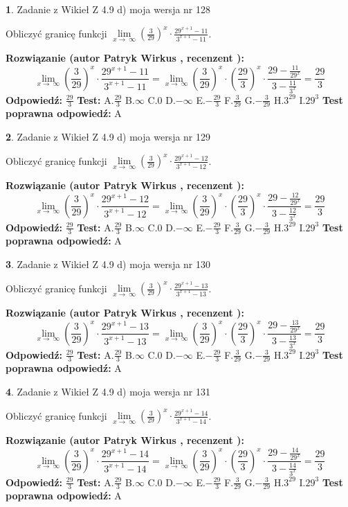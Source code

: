 \documentclass[12pt, a4paper]{article}
\theoremstyle{definition} %
\newtheorem{zad}{}
\newcommand{\zadStart}[1]{\begin{zad}#1\newline}
\newcommand{\zadStop}{\end{zad}}
\newcommand{\rozwStart}[2]{\noindent \textbf{Rozwiązanie (autor #1 , recenzent #2): }\newline}
\newcommand{\rozwStop}{\newline}
\newcommand{\odpStart}{\noindent \textbf{Odpowiedź:}\newline}
\newcommand{\odpStop}{\newline}
\newcommand{\testStart}{\noindent \textbf{Test:}\newline}
\newcommand{\testStop}{\newline}
\newcommand{\kluczStart}{\noindent \textbf{Test poprawna odpowiedź:}\newline}
\newcommand{\kluczStop}{\newline}
\begin{document}
\zadStart{Zadanie z Wikieł Z 4.9 d) moja wersja nr 128}


Obliczyć granicę funkcji  $\lim\limits_{x\to\ \infty}(\frac{3}{29})^{x}\cdot\frac{29^{x+1}-11}{3^{x+1}-11}$.
\zadStop
\rozwStart{Patryk Wirkus}{}
$$\lim\limits_{x\to\ \infty}(\frac{3}{29})^{x}\cdot\frac{29^{x+1}-11}{3^{x+1}-11}=\lim\limits_{x\to\ \infty}(\frac{3}{29})^{x}\cdot(\frac{29}{3})^{x} \cdot \frac{29-\frac{11}{29^{x}}}{3-\frac{11}{3^{x}}} = \frac{29}{3}$$
\rozwStop
\odpStart
$\frac{29}{3}$
\odpStop
\testStart
A.$\frac{29}{3}$ B.$\infty$ C.$0$ D.$-\infty$ E.$-\frac{29}{3}$
F.$\frac{3}{29}$ G.$-\frac{3}{29}$
H.$3^{29}$
I.$29^{3}$
\testStop
\kluczStart
A
\kluczStop



\zadStart{Zadanie z Wikieł Z 4.9 d) moja wersja nr 129}


Obliczyć granicę funkcji  $\lim\limits_{x\to\ \infty}(\frac{3}{29})^{x}\cdot\frac{29^{x+1}-12}{3^{x+1}-12}$.
\zadStop
\rozwStart{Patryk Wirkus}{}
$$\lim\limits_{x\to\ \infty}(\frac{3}{29})^{x}\cdot\frac{29^{x+1}-12}{3^{x+1}-12}=\lim\limits_{x\to\ \infty}(\frac{3}{29})^{x}\cdot(\frac{29}{3})^{x} \cdot \frac{29-\frac{12}{29^{x}}}{3-\frac{12}{3^{x}}} = \frac{29}{3}$$
\rozwStop
\odpStart
$\frac{29}{3}$
\odpStop
\testStart
A.$\frac{29}{3}$ B.$\infty$ C.$0$ D.$-\infty$ E.$-\frac{29}{3}$
F.$\frac{3}{29}$ G.$-\frac{3}{29}$
H.$3^{29}$
I.$29^{3}$
\testStop
\kluczStart
A
\kluczStop



\zadStart{Zadanie z Wikieł Z 4.9 d) moja wersja nr 130}


Obliczyć granicę funkcji  $\lim\limits_{x\to\ \infty}(\frac{3}{29})^{x}\cdot\frac{29^{x+1}-13}{3^{x+1}-13}$.
\zadStop
\rozwStart{Patryk Wirkus}{}
$$\lim\limits_{x\to\ \infty}(\frac{3}{29})^{x}\cdot\frac{29^{x+1}-13}{3^{x+1}-13}=\lim\limits_{x\to\ \infty}(\frac{3}{29})^{x}\cdot(\frac{29}{3})^{x} \cdot \frac{29-\frac{13}{29^{x}}}{3-\frac{13}{3^{x}}} = \frac{29}{3}$$
\rozwStop
\odpStart
$\frac{29}{3}$
\odpStop
\testStart
A.$\frac{29}{3}$ B.$\infty$ C.$0$ D.$-\infty$ E.$-\frac{29}{3}$
F.$\frac{3}{29}$ G.$-\frac{3}{29}$
H.$3^{29}$
I.$29^{3}$
\testStop
\kluczStart
A
\kluczStop



\zadStart{Zadanie z Wikieł Z 4.9 d) moja wersja nr 131}


Obliczyć granicę funkcji  $\lim\limits_{x\to\ \infty}(\frac{3}{29})^{x}\cdot\frac{29^{x+1}-14}{3^{x+1}-14}$.
\zadStop
\rozwStart{Patryk Wirkus}{}
$$\lim\limits_{x\to\ \infty}(\frac{3}{29})^{x}\cdot\frac{29^{x+1}-14}{3^{x+1}-14}=\lim\limits_{x\to\ \infty}(\frac{3}{29})^{x}\cdot(\frac{29}{3})^{x} \cdot \frac{29-\frac{14}{29^{x}}}{3-\frac{14}{3^{x}}} = \frac{29}{3}$$
\rozwStop
\odpStart
$\frac{29}{3}$
\odpStop
\testStart
A.$\frac{29}{3}$ B.$\infty$ C.$0$ D.$-\infty$ E.$-\frac{29}{3}$
F.$\frac{3}{29}$ G.$-\frac{3}{29}$
H.$3^{29}$
I.$29^{3}$
\testStop
\kluczStart
A
\kluczStop
\end{document}
